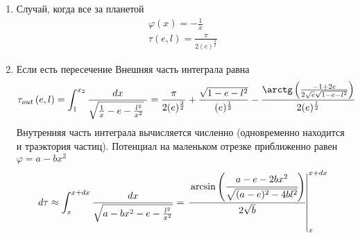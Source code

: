 \begin{enumerate}
	\item Случай, когда все за планетой
	\begin{equation}
		\label{eq:tau_out}
		\begin{split}
			\varphi(x) = - \frac{1}{x}\\
			\tau(e,l) = \frac{\pi}{2\left( e \right)^{\frac{3}{2}}}
		\end{split}
	\end{equation}
	\item Если есть пересечение
	Внешняя часть интеграла равна
	\begin{equation}
		\label{eq:tau_out_eq}
	\tau_{out}\left( {e,l} \right) = {\int_{1}^{x_{2}}\frac{dx}{\sqrt{\frac{1}{x} - e - \frac{l^{2}}{x^{2}}}~}} = \frac{\pi}{2(e)^{\frac{3}{2}}} + \frac{\sqrt{1 - e - l^{2}}}{(e)^{\frac{1}{2}}} - \frac{{\arctg}\left( \frac{- 1 + 2e}{2\sqrt{e}\sqrt{1 - e - l^{2}}} \right)}{2(e)^{\frac{1}{2}}}
	\end{equation}
	Внутренняя часть интеграла вычисляется численно (одновременно находится и траэктория частиц). Потенциал на маленьком отрезке приближенно равен $\varphi = a-bx^2$
	\begin{equation*}
		\label{eq:eval_dt}
		d\tau \approx \int_{x}^{x+dx}\frac{dx}{ \sqrt{a-bx^2 -e - \frac{l^{2}}{x^{2}}}} = \left.\cfrac{\arcsin\left(
				\cfrac{a-e-2bx^2}{\sqrt{(a-e)^2-4bl^2}}
			\right)}{2\sqrt{b}}\right\rvert_{x}^{x+dx}
	\end{equation*}
	
\end{enumerate}